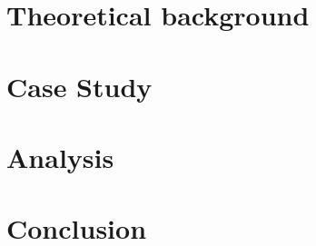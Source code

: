 \documentclass{includes/fhwn-masterthesis}
\begin{document}
\chapter{Theoretical background}
\label{c:background}


\chapter{Case Study}
\label{c:casestudy}


\chapter{Analysis}
\label{c:analysis}


\chapter{Conclusion}
\label{c:conclusion}

    

\backmatter
        
\printbibliography[nottype=online,title={References}]
\printbibliography[heading=subbibliography,type=online,title={Tweet References}]

\appendix


% 
\end{document}
